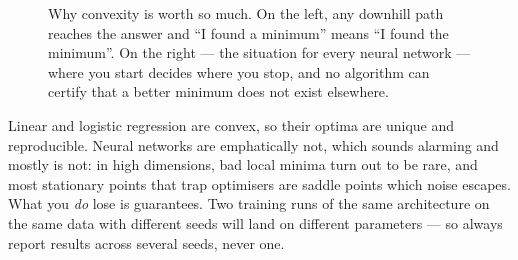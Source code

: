 \begin{figure}[htbp]
\centering
{}
\hfill
{}
\caption{Why convexity is worth so much. On the left, any downhill path reaches
the answer and ``I found a minimum'' means ``I found the minimum''. On the
right --- the situation for every neural network --- where you start decides
where you stop, and no algorithm can certify that a better minimum does not
exist elsewhere.}
\label{fig:math-convexity}
\end{figure}

\begin{cautionbox}
Linear and logistic regression are convex, so their optima are unique and
reproducible. Neural networks are emphatically not, which sounds alarming and
mostly is not: in high dimensions, bad local minima turn out to be rare, and
most stationary points that trap optimisers are saddle points which noise
escapes. What you \emph{do} lose is guarantees. Two training runs of the same
architecture on the same data with different seeds will land on different
parameters --- so always report results across several seeds, never one.
\end{cautionbox}

